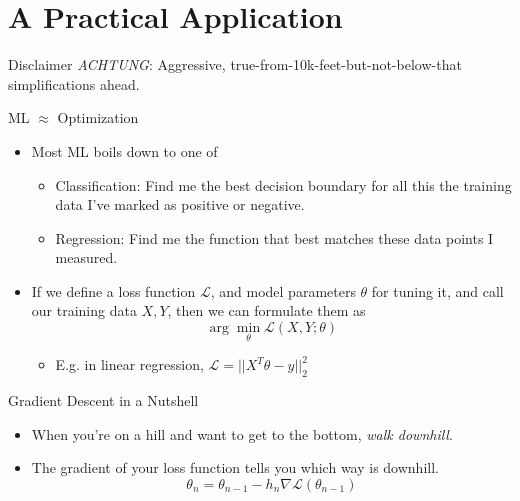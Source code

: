 \documentclass[pdf]{beamer}
\begin{document}
\section{A Practical Application}
\begin{frame}{Disclaimer}
  \emph{ACHTUNG}: Aggressive, true-from-10k-feet-but-not-below-that simplifications
  ahead.
\end{frame}
  
\begin{frame}[fragile]{ML $\approx$ Optimization}
  \begin{itemize}
  \item Most ML boils down to one of
    \begin{itemize}
    \item Classification: Find me the best decision boundary for all this the
      training data I've marked as positive or negative.
    \item Regression: Find me the function that best matches these data points I
      measured.
    \end{itemize}
    \pause
  \item If we define a loss function $\mathcal{L}$, and model parameters
    $\theta$ for tuning it, and call our training data $X, Y$, then we
    can formulate them as
    \[ \arg\min_{\theta} \mathcal{L}(X,Y;\theta) \]
    \begin{itemize}
    \item E.g. in linear regression, $\mathcal{L} = ||X^T\theta - y||_2^2$
    \end{itemize}
  \end{itemize}
\end{frame}

\begin{frame}{Gradient Descent in a Nutshell}
  \begin{itemize}
  \item When you're on a hill and want to get to the bottom, \emph{walk downhill}.
    \pause
  \item The gradient of your loss function tells you which way is downhill.
      \[ \theta_n = \theta_{n-1} - h_n \nabla \mathcal{L}(\theta_{n-1}) \]
  \end{itemize}
\end{frame}
\end{document}
